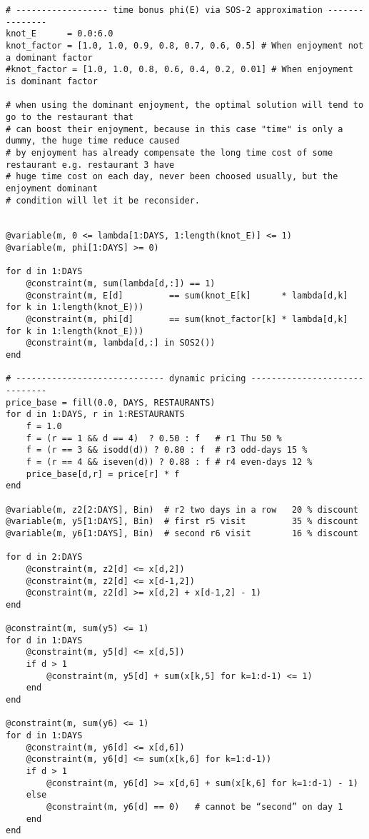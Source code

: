\begin{verbatim}
# ------------------ time bonus phi(E) via SOS‑2 approximation ---------------
knot_E      = 0.0:6.0
knot_factor = [1.0, 1.0, 0.9, 0.8, 0.7, 0.6, 0.5] # When enjoyment not a dominant factor
#knot_factor = [1.0, 1.0, 0.8, 0.6, 0.4, 0.2, 0.01] # When enjoyment is dominant factor 

# when using the dominant enjoyment, the optimal solution will tend to go to the restaurant that 
# can boost their enjoyment, because in this case "time" is only a dummy, the huge time reduce caused 
# by enjoyment has already compensate the long time cost of some restaurant e.g. restaurant 3 have 
# huge time cost on each day, never been choosed usually, but the enjoyment dominant 
# condition will let it be reconsider.


@variable(m, 0 <= lambda[1:DAYS, 1:length(knot_E)] <= 1)
@variable(m, phi[1:DAYS] >= 0)

for d in 1:DAYS
    @constraint(m, sum(lambda[d,:]) == 1)
    @constraint(m, E[d]         == sum(knot_E[k]      * lambda[d,k] for k in 1:length(knot_E)))
    @constraint(m, phi[d]       == sum(knot_factor[k] * lambda[d,k] for k in 1:length(knot_E)))
    @constraint(m, lambda[d,:] in SOS2())
end 

# ----------------------------- dynamic pricing ------------------------------
price_base = fill(0.0, DAYS, RESTAURANTS)
for d in 1:DAYS, r in 1:RESTAURANTS
    f = 1.0
    f = (r == 1 && d == 4)  ? 0.50 : f   # r1 Thu 50 %
    f = (r == 3 && isodd(d)) ? 0.80 : f  # r3 odd‑days 15 %
    f = (r == 4 && iseven(d)) ? 0.88 : f # r4 even‑days 12 %
    price_base[d,r] = price[r] * f
end

@variable(m, z2[2:DAYS], Bin)  # r2 two days in a row   20 % discount
@variable(m, y5[1:DAYS], Bin)  # first r5 visit         35 % discount 
@variable(m, y6[1:DAYS], Bin)  # second r6 visit        16 % discount

for d in 2:DAYS
    @constraint(m, z2[d] <= x[d,2])
    @constraint(m, z2[d] <= x[d-1,2])
    @constraint(m, z2[d] >= x[d,2] + x[d-1,2] - 1)
end

@constraint(m, sum(y5) <= 1)
for d in 1:DAYS
    @constraint(m, y5[d] <= x[d,5])
    if d > 1
        @constraint(m, y5[d] + sum(x[k,5] for k=1:d-1) <= 1)
    end
end

@constraint(m, sum(y6) <= 1)
for d in 1:DAYS
    @constraint(m, y6[d] <= x[d,6])
    @constraint(m, y6[d] <= sum(x[k,6] for k=1:d-1))
    if d > 1
        @constraint(m, y6[d] >= x[d,6] + sum(x[k,6] for k=1:d-1) - 1)
    else
        @constraint(m, y6[d] == 0)   # cannot be “second” on day 1
    end
end


\end{verbatim}
